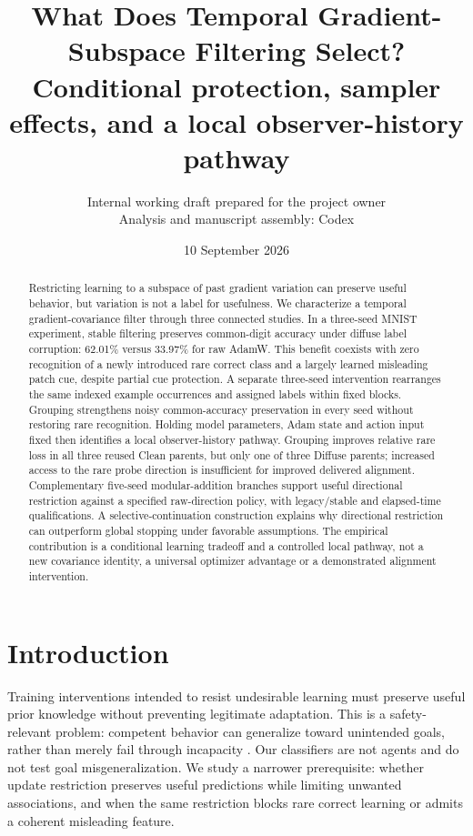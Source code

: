 \documentclass[10pt]{article}
\title{What Does Temporal Gradient-Subspace Filtering Select?\\[5pt]\large Conditional protection, sampler effects, and a local observer-history pathway}
\author{Internal working draft prepared for the project owner\\\small Analysis and manuscript assembly: Codex}
\date{10 September 2026}
\begin{document}
\maketitle
\begin{abstract}
Restricting learning to a subspace of past gradient variation can preserve useful behavior, but variation is not a label for usefulness. We characterize a temporal gradient-covariance filter through three connected studies. In a three-seed MNIST experiment, stable filtering preserves common-digit accuracy under diffuse label corruption: 62.01\% versus 33.97\% for raw AdamW. This benefit coexists with zero recognition of a newly introduced rare correct class and a largely learned misleading patch cue, despite partial cue protection. A separate three-seed intervention rearranges the same indexed example occurrences and assigned labels within fixed blocks. Grouping strengthens noisy common-accuracy preservation in every seed without restoring rare recognition. Holding model parameters, Adam state and action input fixed then identifies a local observer-history pathway. Grouping improves relative rare loss in all three reused Clean parents, but only one of three Diffuse parents; increased access to the rare probe direction is insufficient for improved delivered alignment. Complementary five-seed modular-addition branches support useful directional restriction against a specified raw-direction policy, with legacy/stable and elapsed-time qualifications. A selective-continuation construction explains why directional restriction can outperform global stopping under favorable assumptions. The empirical contribution is a conditional learning tradeoff and a controlled local pathway, not a new covariance identity, a universal optimizer advantage or a demonstrated alignment intervention.
\end{abstract}

\section{Introduction}
Training interventions intended to resist undesirable learning must preserve useful prior knowledge without preventing legitimate adaptation. This is a safety-relevant problem: competent behavior can generalize toward unintended goals, rather than merely fail through incapacity \citep{shah2022goals}. Our classifiers are not agents and do not test goal misgeneralization. We study a narrower prerequisite: whether update restriction preserves useful predictions while limiting unwanted associations, and when the same restriction blocks rare correct learning or admits a coherent misleading feature.
\end{document}
